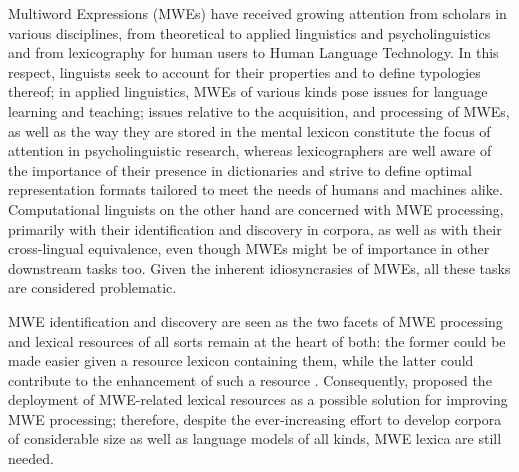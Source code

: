 
\begin{refsection}






Multiword Expressions  (MWEs) have received growing attention    
from scholars in various disciplines, from theoretical to applied linguistics and psycholinguistics and from lexicography for human users to Human Language Technology. In this respect, linguists seek to account for their properties and to define typologies thereof; in applied linguistics, MWEs of various kinds pose issues for language learning and teaching; issues relative to the acquisition, and processing of MWEs, as well as the way they are stored in the mental lexicon constitute the focus of attention in psycholinguistic research, whereas lexicographers are well aware of the importance of their presence in dictionaries \citep{Evert} and strive to define optimal representation formats tailored to meet the needs of humans and machines alike. Computational linguists on the other hand are concerned with MWE processing, primarily with their identification and discovery in corpora, as well as with their cross-lingual equivalence, even though MWEs might be of importance in other downstream tasks too. Given the inherent idiosyncrasies of MWEs, all these tasks are considered problematic. 


MWE identification and discovery are seen as the two facets of MWE processing \citep{constant-etal-2017-survey} and lexical resources of all sorts remain at the heart of both: the former could be made easier given a resource lexicon containing them, while the latter could contribute to the enhancement of such a resource \citep{RamischHab}. Consequently, \citet{savary-etal-2019-without} proposed the deployment of MWE-related lexical resources as a possible solution for improving MWE processing; therefore, despite the ever-increasing effort to develop corpora of considerable size as well as language models of all kinds, MWE lexica are still needed.



\end{refsection}
